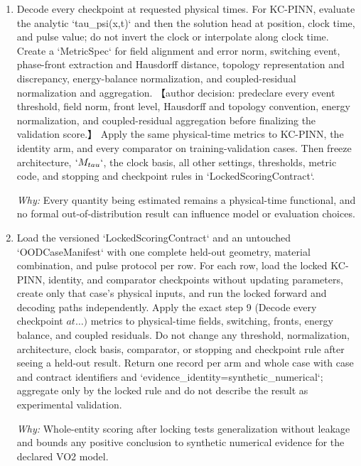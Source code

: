 \documentclass[10pt,a4paper]{article}
\begin{document}
\begin{enumerate}[leftmargin=*,start=7]
\par\emph{Why:} This sole negative-control intervention tests whether downstream gains require the kinetics clock rather than dormant parameters or differently coded physics. The widened unmodified-coordinate arm in step 7 (Describe every comparator in \(a\dots )\) separately gives active-parameter-matched performance.
  \item Decode every checkpoint at requested physical times. For KC-PINN, evaluate the analytic `tau\_psi(x,t)` and then the solution head at position, clock time, and pulse value;\allowbreak{} do not invert the clock or interpolate along clock time. Create a `MetricSpec` for field alignment and error norm, switching event, phase-front extraction and Hausdorff distance, topology representation and discrepancy, energy-balance normalization, and coupled-residual normalization and aggregation. 【author decision: predeclare every event threshold, field norm, front level, Hausdorff and topology convention, energy normalization, and coupled-residual aggregation before finalizing the validation score.】 Apply the same physical-time metrics to KC-PINN, the identity arm, and every comparator on training-validation cases. Then freeze architecture, \(`M_{tau}`\), the clock basis, all other settings, thresholds, metric code, and stopping and checkpoint rules in `LockedScoringContract`.
\par\emph{Why:} Every quantity being estimated remains a physical-time functional, and no formal out-of-distribution result can influence model or evaluation choices.
  \item Load the versioned `LockedScoringContract` and an untouched `OODCaseManifest` with one complete held-out geometry, material combination, and pulse protocol per row. For each row, load the locked KC-PINN, identity, and comparator checkpoints without updating parameters, create only that case's physical inputs, and run the locked forward and decoding paths independently. Apply the exact step 9 (Decode every checkpoint \(at\dots )\) metrics to physical-time fields, switching, fronts, energy balance, and coupled residuals. Do not change any threshold, normalization, architecture, clock basis, comparator, or stopping and checkpoint rule after seeing a held-out result. Return one record per arm and whole case with case and contract identifiers and `evidence\_identity=synthetic\_numerical`;\allowbreak{} aggregate only by the locked rule and do not describe the result as experimental validation.
\par\emph{Why:} Whole-entity scoring after locking tests generalization without leakage and bounds any positive conclusion to synthetic numerical evidence for the declared VO2 model.
\end{enumerate}
\end{document}
